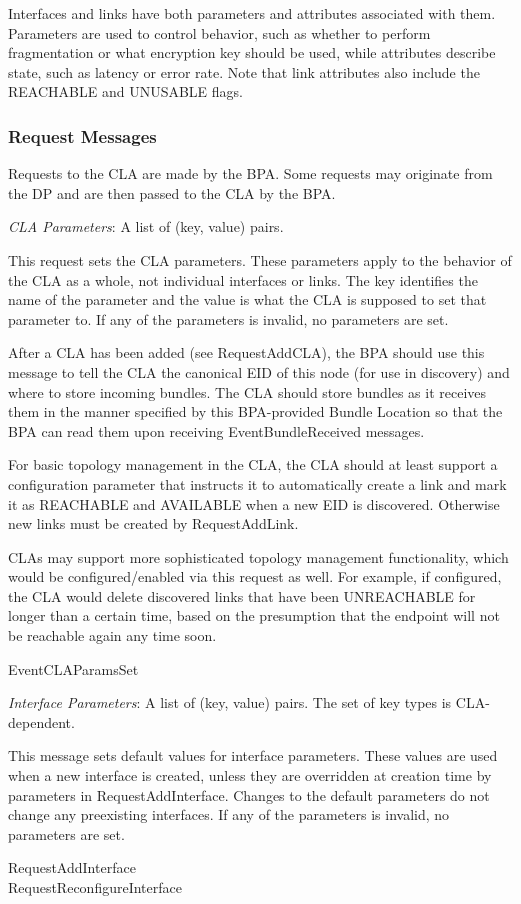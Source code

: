 Interfaces and links have both parameters and attributes associated with
them. Parameters are used to control behavior, such as whether to perform
fragmentation or what encryption key should be used, while attributes
describe state, such as latency or error rate. Note that link attributes
also include the REACHABLE and UNUSABLE flags.

\subsubsection{Request Messages}

Requests to the CLA are made by the BPA. Some requests may originate from
the DP and are then passed to the CLA by the BPA.\\[1em]

{
\metP
    {\em CLA Parameters}: A list of (key, value) pairs.

\metD
    This request sets the CLA parameters. These parameters apply to the
    behavior of the CLA as a whole, not individual interfaces or links. The
    key identifies the name of the parameter and the value is what the CLA is
    supposed to set that parameter to. If any of the parameters is invalid,
    no parameters are set.

    After a CLA has been added (see RequestAddCLA), the BPA should use this
    message to tell the CLA the canonical EID of this node (for use in
    discovery) and where to store incoming bundles. The CLA should store
    bundles as it receives them in the manner specified by this BPA-provided
    Bundle Location so that the BPA can read them upon receiving
    EventBundleReceived messages.

    For basic topology management in the CLA, the CLA should at least support a
    configuration parameter that instructs it to automatically create a link
    and mark it as REACHABLE and AVAILABLE when a new EID is
    discovered. Otherwise new links must be created by RequestAddLink.

    CLAs may support more sophisticated topology management functionality,
    which would be configured/enabled via this request as well. For example,
    if configured, the CLA would delete discovered links that have been
    UNREACHABLE for longer than a certain time, based on the presumption that
    the endpoint will not be reachable again any time soon.

\metR
    EventCLAParamsSet
}

{
\metP
    {\em Interface Parameters}: A list of (key, value) pairs. The set of key
    types is CLA-dependent.

\metD
    This message sets default values for interface parameters. These values are
    used when a new interface is created, unless they are overridden at
    creation time by parameters in RequestAddInterface. Changes to the default
    parameters do not change any preexisting interfaces. If any of the
    parameters is invalid, no parameters are set.

\metR
    RequestAddInterface\\
    RequestReconfigureInterface
}
    
